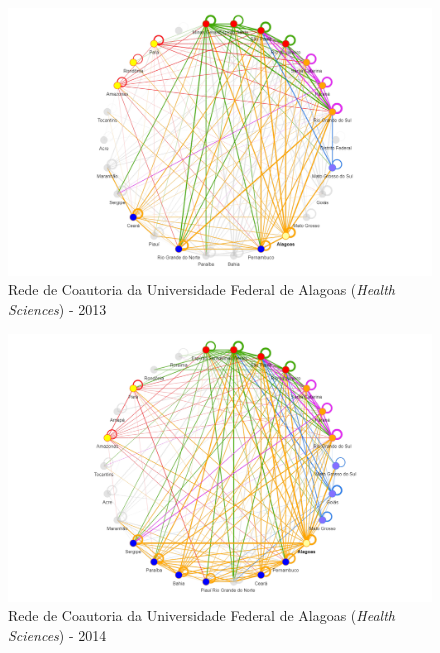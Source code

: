 \begin{figure}[H]
	\centering
	\includegraphics[width=\linewidth]{Imagens/rede-al-2013.pdf}
	\caption{Rede de Coautoria da Universidade Federal de Alagoas (\textit{Health Sciences}) - 2013}
	\label{Rede de Coautoria - UF AL 2013}
\end{figure}

\begin{figure}[H]
	\centering
	\includegraphics[width=\linewidth]{Imagens/rede-al-2014.pdf}
	\caption{Rede de Coautoria da Universidade Federal de Alagoas (\textit{Health Sciences}) - 2014}
	\label{Rede de Coautoria - UF AL 2014}
\end{figure}


